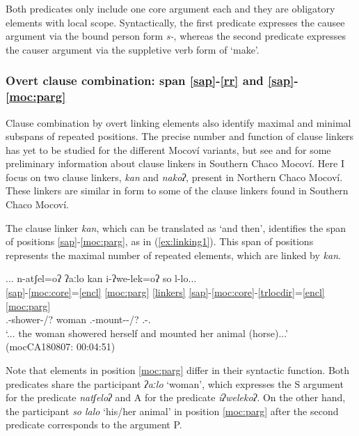 \documentclass[output=paper]{langscibook}
\begin{document}
Both predicates only include one core argument each and they are obligatory elements with local scope. Syntactically,  the first predicate expresses the causee argument via the bound person form \textit{s-}, whereas the second predicate expresses the causer argument via the suppletive verb form of `make'. 

\subsubsection{Overt clause combination: span \ref{sap}-\ref{rr} and \ref{sap}-\ref{moc:parg}}   
Clause combination by overt linking elements also identify maximal and minimal subspans of repeated positions.  The precise number and function of clause linkers has yet to be studied for the different Mocoví variants, but see \citet[170--175]{Grondona1998} and \citet[109--113]{Gualdieri1998} for some preliminary information about clause linkers in Southern Chaco Mocoví.
Here I focus on two clause linkers, \textit{kan} and \textit{nakoʔ}, present in Northern Chaco Mocoví. These linkers are similar in form to some of the clause linkers found in Southern Chaco Mocoví. 

The clause linker \textit{kan}, which can be translated as `and then', identifies the span of positions  \ref{sap}-\ref{moc:parg}, as in (\ref{ex:linking1}).  This span of positions represents the maximal number of repeated elements, which are linked by \textit{kan}. 

\ea \label{ex:linking1}
\glll ... n-atʃel=oʔ ʔaːlo kan i-ʔwe-lek=oʔ so l-lo... \\
 {} \ref{sap}-\ref{moc:core}=\ref{encl} \ref{moc:parg} \ref{linkers} \ref{sap}-\ref{moc:core}-\ref{trlocdir}=\ref{encl} \ref{moc:parg} \\ 
 {} {\Third.\III}-shower-{\Evid/\Tprl}? {woman} {\LinkTwo} {\Third.\II}-mount-{\LocOne}-{\Evid/\Tprl}? {\DetTwo} {\Third.\Poss}-{\Poss.\Clf}\\
\glt `... the woman showered herself and mounted her animal (horse)...'\\
\glt \hfill (mocCA180807: 00:04:51)
\z 

 Note that elements in position \ref{moc:parg} differ in their syntactic function. Both predicates share the participant \textit{ʔaːlo} `woman', which expresses the S argument for the predicate \textit{natʃeloʔ} and A for the predicate \textit{iʔwelekoʔ}. On the other hand, the participant \textit{so lalo} `his/her animal' in position \ref{moc:parg} after the second predicate corresponds to the argument P.     
\end{document}
